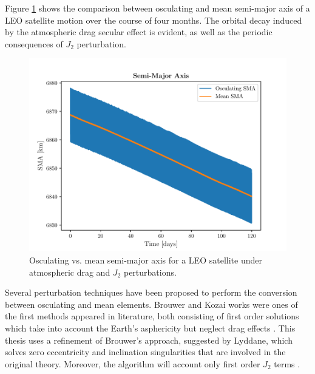 Figure \ref{osc_vs_mean_sma} shows the comparison between osculating and mean semi-major axis of a LEO satellite motion over the course of four months.
The orbital decay induced by the atmospheric drag secular effect is evident, as well as the periodic consequences of $J_2$ perturbation.
\begin{figure}[h]
    \centering
    \includegraphics[scale=0.9]{img/osc_vs_mean.pdf}
        \caption{Osculating vs. mean semi-major axis for a LEO satellite under atmospheric drag and $J_2$ perturbations.}
    \label{osc_vs_mean_sma}
\end{figure}

Several perturbation techniques have been proposed to perform the conversion between osculating and mean elements. 
Brouwer and Kozai works were ones of the first methods appeared in literature, both consisting of first order solutions which take into account the Earth's asphericity but neglect drag effects \cite{arnas2022analytic}.
This thesis uses a refinement of Brouwer's approach, suggested by Lyddane, which solves zero eccentricity and inclination singularities that are involved in the original theory.
Moreover, the algorithm will account only first order $J_2$ terms \cite{schaub2002analytical}.


